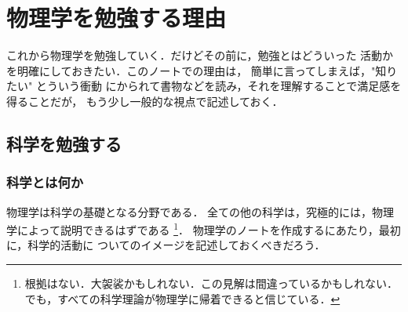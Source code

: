     \section{物理学を勉強する理由}
        \begin{mycomment}
            これから物理学を勉強していく．だけどその前に，勉強とはどういった
            活動かを明確にしておきたい．このノートでの理由は，
            簡単に言ってしまえば，"知りたい" とういう衝動
            にかられて書物などを読み，それを理解することで満足感を得ることだが，
            もう少し一般的な視点で記述しておく．
        \end{mycomment}

        \subsection{科学を勉強する}
        \subsubsection{科学とは何か}
            物理学は科学の基礎となる分野である．
            全ての他の科学は，究極的には，物理学によって説明できるはずである
                \footnote{
                    根拠はない．大袈裟かもしれない．この見解は間違っているかもしれない．
                    でも，すべての科学理論が物理学に帰着できると信じている．
                }．
            物理学のノートを作成するにあたり，最初に，科学的活動に
            ついてのイメージを記述しておくべきだろう．

